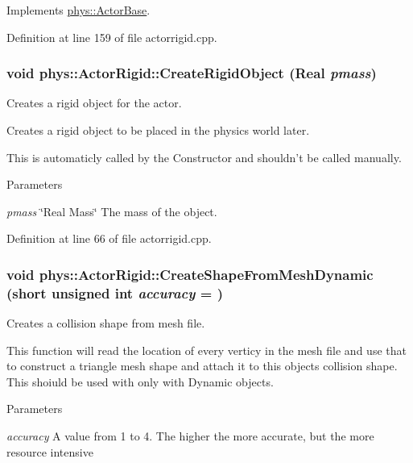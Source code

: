 Implements \hyperlink{classphys_1_1ActorBase_ac5d4ad5a634b16000742f506ed5957fb}{phys::ActorBase}.



Definition at line 159 of file actorrigid.cpp.

\hypertarget{classphys_1_1ActorRigid_a19227c52b972cd96ad69a7b6273e2bbf}{
\subsubsection[{CreateRigidObject}]{\setlength{\rightskip}{0pt plus 5cm}void phys::ActorRigid::CreateRigidObject ({\bf Real} {\em pmass})}}
\label{d8/d71/classphys_1_1ActorRigid_a19227c52b972cd96ad69a7b6273e2bbf}


Creates a rigid object for the actor. 

Creates a rigid object to be placed in the physics world later. \par
 This is automaticly called by the Constructor and shouldn't be called manually. 
\begin{DoxyParams}{Parameters}
\item[{\em pmass}]\char`\"{}Real Mass\char`\"{} The mass of the object. \end{DoxyParams}


Definition at line 66 of file actorrigid.cpp.

\hypertarget{classphys_1_1ActorRigid_aab4a408ce0724be6adf4c9f51f55f8a1}{
\subsubsection[{CreateShapeFromMeshDynamic}]{\setlength{\rightskip}{0pt plus 5cm}void phys::ActorRigid::CreateShapeFromMeshDynamic (short unsigned int {\em accuracy} = {})}}
\label{d8/d71/classphys_1_1ActorRigid_aab4a408ce0724be6adf4c9f51f55f8a1}


Creates a collision shape from mesh file. 

This function will read the location of every verticy in the mesh file and use that to construct a triangle mesh shape and attach it to this objects collision shape. This shoiuld be used with only with Dynamic objects. 
\begin{DoxyParams}{Parameters}
\item[{\em accuracy}]A value from 1 to 4. The higher the more accurate, but the more resource intensive \end{DoxyParams}


